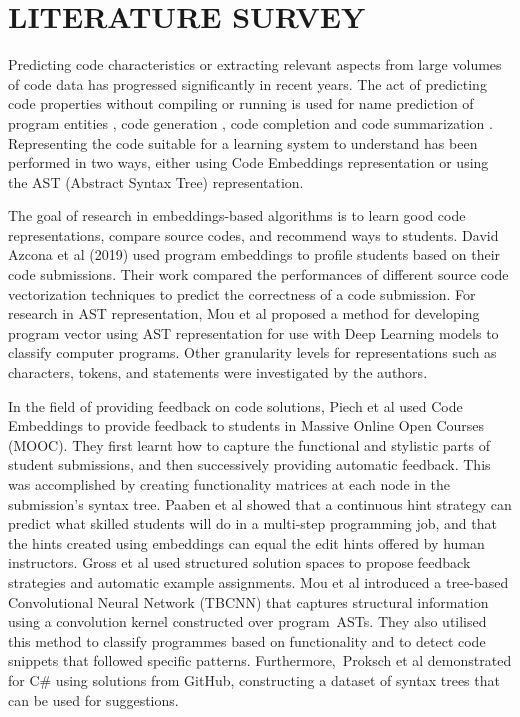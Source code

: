 
\chapter{LITERATURE SURVEY} %

Predicting code characteristics or extracting relevant
aspects from large volumes of code data has progressed
significantly in recent years. The act of predicting code
properties without compiling or running is used for name
prediction of program entities \cite{I}, code generation
\cite{J}, code completion \cite{K} and code summarization
\cite{L}. Representing the code suitable for a learning
system to understand has been performed in two ways, either
using Code Embeddings representation or using the AST
(Abstract Syntax Tree) representation.

The goal of research in embeddings-based algorithms is to
learn good code representations, compare source codes, and
recommend ways to students. David Azcona et al (2019)
\cite{A} used program embeddings to profile students based on
their code submissions. Their work compared the performances
of different source code vectorization techniques to predict
the correctness of a code submission. For research in AST
representation, Mou et al \cite{M} proposed a method for
developing program vector using AST representation for use
with Deep Learning models to classify computer
programs. Other granularity levels for representations such
as characters, tokens, and statements were investigated by
the authors.

In the field of providing feedback on code solutions, Piech
et al \cite{N} used Code Embeddings to provide feedback to
students in Massive Online Open Courses (MOOC). They first
learnt how to capture the functional and stylistic parts of
student submissions, and then successively providing
automatic feedback. This was accomplished by creating
functionality matrices at each node in the submission's
syntax tree. Paaben et al \cite{O} showed that a continuous
hint strategy can predict what skilled students will do in a
multi-step programming job, and that the hints created using
embeddings can equal the edit hints offered by human
instructors. Gross et al \cite{P} used structured solution
spaces to propose feedback strategies and automatic example
assignments. Mou et al \cite{Q} introduced a tree-based
Convolutional Neural Network (TBCNN) that captures structural
information using a convolution kernel constructed over
program ASTs. They also utilised this method to classify
programmes based on functionality and to detect code snippets
that followed specific patterns. Furthermore, Proksch et al
\cite{R} demonstrated for C\# using solutions from GitHub,
constructing a dataset of syntax trees that can be used for
suggestions.

